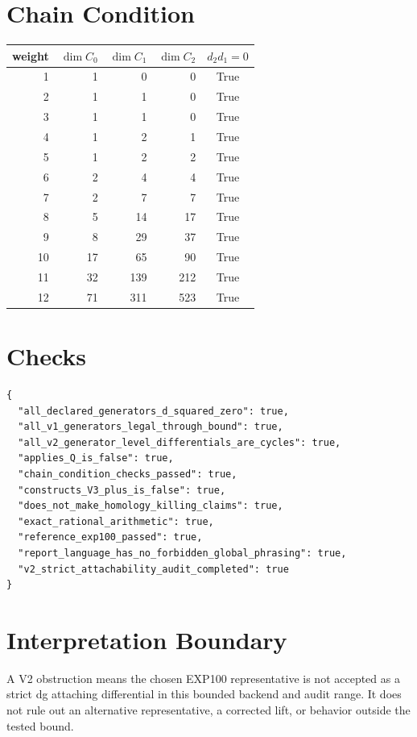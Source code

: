 \documentclass[11pt]{article}
\begin{document}
\section*{Chain Condition}
\begin{center}
\begin{tabular}{rrrrc}
\toprule weight & $\dim C_0$ & $\dim C_1$ & $\dim C_2$ & $d_2d_1=0$ \\
\midrule
1 & 1 & 0 & 0 & True \\
2 & 1 & 1 & 0 & True \\
3 & 1 & 1 & 0 & True \\
4 & 1 & 2 & 1 & True \\
5 & 1 & 2 & 2 & True \\
6 & 2 & 4 & 4 & True \\
7 & 2 & 7 & 7 & True \\
8 & 5 & 14 & 17 & True \\
9 & 8 & 29 & 37 & True \\
10 & 17 & 65 & 90 & True \\
11 & 32 & 139 & 212 & True \\
12 & 71 & 311 & 523 & True \\
\bottomrule
\end{tabular}
\end{center}
\section*{Checks}
\begin{verbatim}
{
  "all_declared_generators_d_squared_zero": true,
  "all_v1_generators_legal_through_bound": true,
  "all_v2_generator_level_differentials_are_cycles": true,
  "applies_Q_is_false": true,
  "chain_condition_checks_passed": true,
  "constructs_V3_plus_is_false": true,
  "does_not_make_homology_killing_claims": true,
  "exact_rational_arithmetic": true,
  "reference_exp100_passed": true,
  "report_language_has_no_forbidden_global_phrasing": true,
  "v2_strict_attachability_audit_completed": true
}
\end{verbatim}
\section*{Interpretation Boundary}
A V2 obstruction means the chosen EXP100 representative is not accepted as a strict dg attaching differential in this bounded backend and audit range. It does not rule out an alternative representative, a corrected lift, or behavior outside the tested bound.
\end{document}
